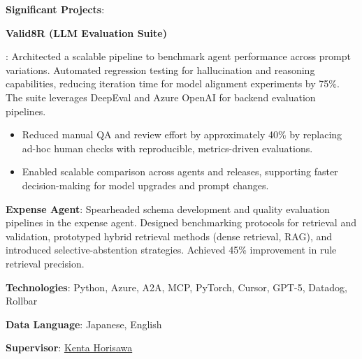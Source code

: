 \documentclass[margin]{res}
\newcommand{\SubItem}[1]{
    {\setlength\itemindent{15pt} \item[-] #1}
}
\begin{document}
\begin{resume}
\begin{position}
\begin{itemize}
    \item \textbf{Significant Projects}:
    \SubItem{\textbf{Valid8R (LLM Evaluation Suite)}}: Architected a scalable pipeline to benchmark agent performance across prompt variations. Automated regression testing for hallucination and reasoning capabilities, reducing iteration time for model alignment experiments by 75\%. The suite leverages DeepEval and Azure OpenAI for backend evaluation pipelines.
    \begin{itemize}
        \item Reduced manual QA and review effort by approximately 40\% by replacing ad-hoc human checks with reproducible, metrics-driven evaluations.
        \item Enabled scalable comparison across agents and releases, supporting faster decision-making for model upgrades and prompt changes.
    \end{itemize}
    \SubItem{\textbf{Expense Agent}: Spearheaded schema development and quality evaluation pipelines in the expense agent. Designed benchmarking protocols for retrieval and validation, prototyped hybrid retrieval methods (dense retrieval, RAG), and introduced selective-abstention strategies. Achieved 45\% improvement in rule retrieval precision.}
    \item \textbf{Technologies}: Python, Azure, A2A, MCP, PyTorch, Cursor, GPT-5, Datadog, Rollbar
    \item \textbf{Data Language}: Japanese, English
    \item \textbf{Supervisor}: \href{https://www.linkedin.com/in/%E5%81%A5%E5%A4%AA-%E5%A0%80%E6%BE%A4-5934491b8/}{Kenta Horisawa}
\end{itemize}
\end{position}

\vspace{-1mm}


\end{resume}
\end{document}
